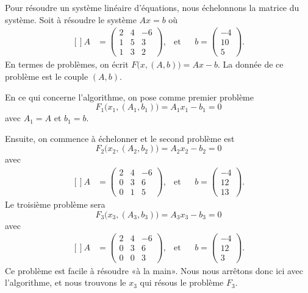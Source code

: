 Pour résoudre un système linéaire d'équations, nous échelonnons la matrice du système. Soit à résoudre le système $Ax=b$ où
\begin{equation}
	\begin{aligned}[]
		A&=\begin{pmatrix}
			2   &   4   &   -6  \\
			1   &   5   &   3   \\
			1   &   3   &   2
		\end{pmatrix}, &\text{et}&&b=\begin{pmatrix}
			-4  \\
			10  \\
			5
		\end{pmatrix}.
	\end{aligned}
\end{equation}
En termes de problèmes, on écrit $F\big( x,(A,b) \big)=Ax-b$. La donnée de ce problème est le couple $(A,b)$.

En ce qui concerne l'algorithme, on pose comme premier problème
\begin{equation}
	F_1\big(x_1,(A_1,b_1)\big)=A_1x_1-b_1=0
\end{equation}
avec $A_1=A$ et $b_1=b$.

Ensuite, on commence à échelonner et le second problème est
\begin{equation}
	F_2\big(x_2,(A_2,b_2)\big)=A_2x_2-b_2=0
\end{equation}
avec
\begin{equation}
	\begin{aligned}[]
		A&=\begin{pmatrix}
			2   &   4   &   -6  \\
			0   &   3   &   6   \\
			0   &   1   &   5
		\end{pmatrix}, &\text{et}&&b=\begin{pmatrix}
			-4  \\
			12  \\
			13
		\end{pmatrix}.
	\end{aligned}
\end{equation}
Le troisième problème sera
\begin{equation}
	F_3\big(x_3,(A_3,b_3)\big)=A_3x_3-b_3=0
\end{equation}
avec
\begin{equation}
	\begin{aligned}[]
		A&=\begin{pmatrix}
			2   &   4   &   -6  \\
			0   &   3   &   6   \\
			0   &   0   &   3
		\end{pmatrix}, &\text{et}&&b=\begin{pmatrix}
			-4  \\
			12  \\
			3
		\end{pmatrix}.
	\end{aligned}
\end{equation}
Ce problème est facile à résoudre «à la main». Nous nous arrêtons donc ici avec l'algorithme, et nous trouvons le $x_3$ qui résous le problème $F_3$.

